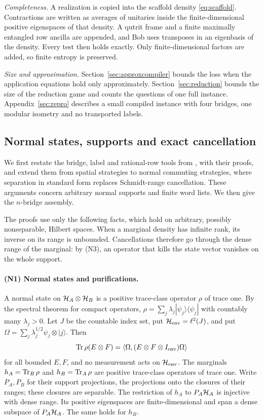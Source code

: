 \emph{Completeness.} A realization is copied into the scaffold density \eqref{eq:scaffold}. Contractions are written as averages of unitaries inside the finite-dimensional positive eigenspaces of that density. A qutrit frame and a finite maximally entangled row ancilla are appended, and Bob uses transposes in an eigenbasis of the density. Every test then holds exactly. Only finite-dimensional factors are added, so finite entropy is preserved.

\emph{Size and approximation.} Section~\ref{sec:approxcompiler} bounds the loss when the application equations hold only approximately. Section~\ref{sec:reduction} bounds the size of the reduction game and counts the questions of one full instance. Appendix~\ref{sec:repro} describes a small compiled instance with four bridges, one modular isometry and no transported labels.


\subsection*{Normal states, supports and exact cancellation}
We first restate the bridge, label and rational-row tools from \cite[Lemmas~4.1 and 4.2, Theorem~B, Eq.~(32)]{Entropy}, with their proofs, and extend them from spatial strategies to normal commuting strategies, where separation in standard form replaces Schmidt-range cancellation. These arguments concern arbitrary normal supports and finite word lists. We then give the $n$-bridge assembly.

The proofs use only the following facts, which hold on arbitrary, possibly nonseparable, Hilbert spaces. When a marginal density has infinite rank, its inverse on its range is unbounded. Cancellations therefore go through the dense range of the marginal: by (N3), an operator that kills the state vector vanishes on the whole support.

\paragraph{(N1) Normal states and purifications.}
A normal state on $\mathcal H_A\otimes\mathcal H_B$ is a positive trace-class operator $\rho$ of trace one. By the spectral theorem for compact operators, $\rho=\sum_j\lambda_j|\psi_j\rangle\langle\psi_j|$ with countably many $\lambda_j>0$. Let $J$ be the countable index set, put $\mathcal H_{\rm env}=\ell^2(J)$, and put $\Omega=\sum_j\lambda_j^{1/2}\psi_j\otimes|j\rangle$. Then
\[
 \operatorname{Tr}\rho(E\otimes F)=\langle\Omega,(E\otimes F\otimes I_{\rm env})\Omega\rangle
\]
for all bounded $E,F$, and no measurement acts on $\mathcal H_{\rm env}$. The marginals $h_A=\operatorname{Tr}_B\rho$ and $h_B=\operatorname{Tr}_A\rho$ are positive trace-class operators of trace one. Write $P_A,P_B$ for their support projections, the projections onto the closures of their ranges; these closures are separable. The restriction of $h_A$ to $P_A\mathcal H_A$ is injective with dense range. Its positive eigenspaces are finite-dimensional and span a dense subspace of $P_A\mathcal H_A$. The same holds for $h_B$.

